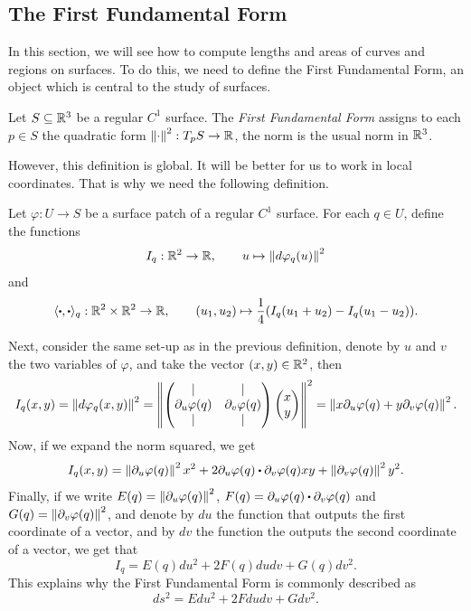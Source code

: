 \subsection{The First Fundamental Form}

In this section, we will see how to compute lengths and areas of curves and regions on surfaces. To do this, we need to define the First Fundamental Form, an object which is central to the study of surfaces.

\begin{definition}
    Let $S \subseteq \mathbb{R}^3$ be a regular $C^1$ surface. The \textit{First Fundamental Form} assigns to each $p \in S$ the quadratic form $\left\lVert\cdot \right\rVert^2 : T_p S \to \mathbb{R}$, the norm is the usual norm in $\mathbb{R}^3$.
\end{definition}

However, this definition is global. It will be better for us to work in local coordinates. That is why we need the following definition.

\begin{definition}
    Let $\varphi : U \to S$ be a surface patch of a regular $C^1$ surface. For each $q \in U$, define the functions
    $$I_q : \mathbb{R}^2 \to \mathbb{R}, \qquad u \mapsto \left\lVert d\varphi_q (u) \right\rVert^2$$
    and 
    $$\langle \bigcdot, \bigcdot \rangle_q : \R^2\times \R^2 \to \R, \qquad (u_1,u_2) \mapsto \frac{1}{4}(I_q(u_1 + u_2) - I_q(u_1 - u_2)).$$
\end{definition}

Next, consider the same set-up as in the previous definition, denote by $u$ and $v$ the two variables of $\varphi$, and take the vector $(x,y) \in \mathbb{R}^2$, then
$$I_q(x,y) = \left\lVert d\varphi_q(x,y) \right\rVert^2 = \left\lVert\begin{pmatrix}
    | & | \\ \partial_u\varphi(q) & \partial_v\varphi(q) \\ | & |
\end{pmatrix} \begin{pmatrix}
    x \\ y
\end{pmatrix}  \right\rVert^2 = \left\lVert x\partial_u\varphi(q) + y \partial_v\varphi(q) \right\rVert^2.$$
Now, if we expand the norm squared, we get 
$$I_q(x,y) = \norm{\partial_u\varphi(q)}^2x^2 + 2\partial_u\varphi(q)\bigcdot \partial_v\varphi(q) xy + \norm{\partial_v\varphi(q)}^2y^2.$$
Finally, if we write $E(q) = \left\lVert\partial_u\varphi(q) \right\rVert^2$, $F(q) = \partial_u\varphi(q)\bigcdot \partial_v\varphi(q)$ and $G(q) = \left\lVert\partial_v\varphi(q) \right\rVert^2$, and denote by $du$ the function that outputs the first coordinate of a vector, and by $dv$ the function the outputs the second coordinate of a vector, we get that
$$I_q = E(q)du^2 + 2F(q)dudv + G(q)dv^2.$$
This explains why the First Fundamental Form is commonly described as
$$ds^2 = Edu^2 + 2Fdudv + Gdv^2.$$
\td

